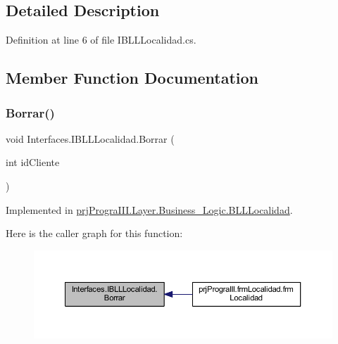 \subsection{Detailed Description}


Definition at line 6 of file I\+B\+L\+L\+Localidad.\+cs.



\subsection{Member Function Documentation}
\hypertarget{interface_interfaces_1_1_i_b_l_l_localidad_aea523587dbbeda757d93e79f4207bcc2}{}\label{interface_interfaces_1_1_i_b_l_l_localidad_aea523587dbbeda757d93e79f4207bcc2} 
\subsubsection{\texorpdfstring{Borrar()}{Borrar()}}
{\footnotesize\ttfamily void Interfaces.\+I\+B\+L\+L\+Localidad.\+Borrar (\begin{DoxyParamCaption}\item[{int}]{id\+Cliente }\end{DoxyParamCaption})}



Implemented in \hyperlink{classprj_progra_i_i_i_1_1_layer_1_1_business___logic_1_1_b_l_l_localidad_a6f043ce9e0864bd477c37e7d6d228e0e}{prj\+Progra\+I\+I\+I.\+Layer.\+Business\+\_\+\+Logic.\+B\+L\+L\+Localidad}.

Here is the caller graph for this function\+:
\nopagebreak
\begin{figure}[H]
\begin{center}
\leavevmode
\includegraphics[width=350pt]{interface_interfaces_1_1_i_b_l_l_localidad_aea523587dbbeda757d93e79f4207bcc2_icgraph}
\end{center}
\end{figure}
\hypertarget{interface_interfaces_1_1_i_b_l_l_localidad_a988cb353619c30e2ec9453e8f027a8b0}{}\label{interface_interfaces_1_1_i_b_l_l_localidad_a988cb353619c30e2ec9453e8f027a8b0} 
